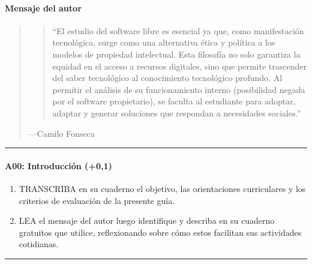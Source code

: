 \documentclass[letterpaper,10pt,spanish]{sphinxmanual}
\begin{document}
\paragraph{Mensaje del autor}
\label{\detokenize{cursos/ofimatica10/periodo01/G02:mensaje-del-autor}}\begin{quote}
\begin{quote}

\sphinxAtStartPar
“El estudio del software libre es esencial ya que, como manifestación tecnológica, surge como una alternativa ética y política a los modelos de propiedad intelectual. Esta filosofía no solo garantiza la equidad en el acceso a recursos digitales, sino que permite trascender del saber tecnológico al conocimiento tecnológico profundo. Al permitir el análisis de su funcionamiento interno (posibilidad negada por el software propietario), se faculta al estudiante para adoptar, adaptar y generar soluciones que respondan a necesidades sociales.”
\end{quote}

\begin{flushright}
---Camilo Fonseca
\end{flushright}
\end{quote}


\bigskip\hrule\bigskip



\paragraph{A00: Introducción (+0,1)}
\label{\detokenize{cursos/ofimatica10/periodo01/G02:a00-introduccion-0-1}}
\sphinxAtStartPar
{}
\begin{enumerate}
%
\item {} 
\sphinxAtStartPar
TRANSCRIBA en su cuaderno el objetivo, las orientaciones curriculares y los criterios de evaluación de la presente guía.

\item {} 
\sphinxAtStartPar
LEA el mensaje del autor luego identifique y describa en su cuaderno  gratuitos que utilice, reflexionando sobre cómo estos facilitan sus actividades cotidianas.

\end{enumerate}


\bigskip\hrule\bigskip
\end{document}
